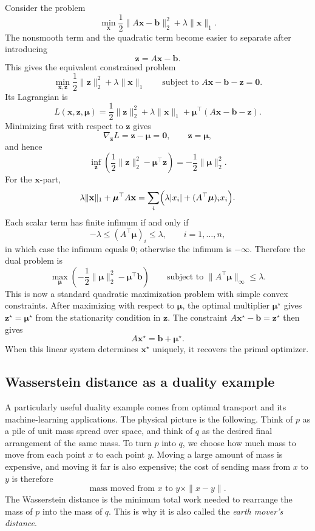 \begin{example}
\label{ex:ch8-dual-lasso}
Consider the problem
\[
  \min_{\mathbf{x}}
  \frac12 \|A\mathbf{x}-\mathbf{b}\|_2^2 + \lambda \|\mathbf{x}\|_1.
\]
The nonsmooth term and the quadratic term become easier to separate after
introducing
\[
  \mathbf{z}=A\mathbf{x}-\mathbf{b}.
\]
This gives the equivalent constrained problem
\[
  \min_{\mathbf{x},\mathbf{z}}
  \frac12 \|\mathbf{z}\|_2^2 + \lambda \|\mathbf{x}\|_1
  \qquad
  \text{subject to }
  A\mathbf{x}-\mathbf{b}-\mathbf{z}=\mathbf{0}.
\]
Its Lagrangian is
\[
  L(\mathbf{x},\mathbf{z},\boldsymbol{\mu})
  =
  \frac12 \|\mathbf{z}\|_2^2
  + \lambda \|\mathbf{x}\|_1
  + \boldsymbol{\mu}^\top(A\mathbf{x}-\mathbf{b}-\mathbf{z}).
\]
Minimizing first with respect to $\mathbf{z}$ gives
\[
  \nabla_{\mathbf{z}} L = \mathbf{z}-\boldsymbol{\mu}=\mathbf{0},
  \qquad
  \mathbf{z}=\boldsymbol{\mu},
\]
and hence
\[
  \inf_{\mathbf{z}}
  \left(
    \frac12 \|\mathbf{z}\|_2^2
    - \boldsymbol{\mu}^\top \mathbf{z}
  \right)
  =
  -\frac12 \|\boldsymbol{\mu}\|_2^2.
\]
For the $\mathbf{x}$-part,
\[
  \lambda \|\mathbf{x}\|_1 + \boldsymbol{\mu}^\top A\mathbf{x}
  =
  \sum_i
  \Bigl(
    \lambda |x_i| + (A^\top \boldsymbol{\mu})_i x_i
  \Bigr).
\]
Each scalar term has finite infimum if and only if
\[
  -\lambda \le (A^\top \boldsymbol{\mu})_i \le \lambda,
  \qquad i=1,\dots,n,
\]
in which case the infimum equals $0$; otherwise the infimum is $-\infty$.
Therefore the dual problem is
\[
  \max_{\boldsymbol{\mu}}
  \left(
    -\frac12 \|\boldsymbol{\mu}\|_2^2
    - \boldsymbol{\mu}^\top \mathbf{b}
  \right)
  \qquad
  \text{subject to }
  \|A^\top \boldsymbol{\mu}\|_\infty \le \lambda.
\]
This is now a standard quadratic maximization problem
with simple convex constraints.
After maximizing with respect to $\boldsymbol{\mu}$, the optimal multiplier
$\boldsymbol{\mu}^\star$ gives
$\mathbf{z}^\star=\boldsymbol{\mu}^\star$ from the stationarity condition in
$\mathbf{z}$. The constraint
$A\mathbf{x}^\star-\mathbf{b}=\mathbf{z}^\star$ then gives
\[
  A\mathbf{x}^\star=\mathbf{b}+\boldsymbol{\mu}^\star.
\]
When this linear system determines $\mathbf{x}^\star$ uniquely, it recovers the
primal optimizer.
\end{example}

\subsection{Wasserstein distance as a duality example}
\label{subsec:ch8-wasserstein}
A particularly useful duality example comes from optimal transport and its
machine-learning applications. The physical picture is the following. Think of
$p$ as a pile of unit mass spread over space, and think of $q$ as the desired
final arrangement of the same mass. To turn $p$ into $q$, we choose how much
mass to move from each point $x$ to each point $y$. Moving a large amount of
mass is expensive, and moving it far is also expensive; the cost of sending
mass from $x$ to $y$ is therefore
\[
  \text{mass moved from } x \text{ to } y
  \times
  \|x-y\|.
\]
The Wasserstein distance is the minimum total work needed to rearrange the mass
of $p$ into the mass of $q$. This is why it is also called the
\emph{earth mover's distance}.

